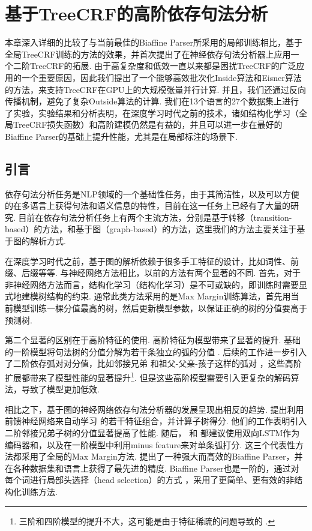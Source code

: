 \chapter{基于TreeCRF的高阶依存句法分析}\label{cha:dep-crf}

本章深入详细的比较了与当前最佳的Biaffine Parser所采用的局部训练相比，基于全局TreeCRF训练的方法的效果，并首次提出了在神经依存句法分析器上应用一个二阶TreeCRF的拓展.
由于高复杂度和低效一直以来都是困扰TreeCRF的广泛应用的一个重要原因，因此我们提出了一个能够高效批次化Inside算法和Eisner算法的方法，来支持TreeCRF在GPU上的大规模张量并行计算.
并且，我们还通过反向传播机制，避免了复杂Outside算法的计算.
我们在13个语言的27个数据集上进行了实验，实验结果和分析表明，在深度学习时代之前的技术，诸如结构化学习（全局TreeCRF损失函数）和高阶建模仍然是有益的，并且可以进一步在最好的Biaffine Parser的基础上提升性能，尤其是在局部标注的场景下.

\section{引言}
依存句法分析任务是NLP领域的一个基础性任务，由于其简洁性，以及可以方便的在多语言上获得句法和语义信息的特性，目前在这一任务上已经有了大量的研究.
目前在依存句法分析任务上有两个主流方法，分别是基于转移（transition-based）的方法，和基于图（graph-based）的方法，这里我们的方法主要关注于基于图的解析方式.

在深度学习时代之前，基于图的解析依赖于很多手工特征的设计，比如词性、前缀、后缀等等.
与神经网络方法相比，以前的方法有两个显著的不同.
首先，对于非神经网络方法而言，结构化学习（结构化学习）是不可或缺的，即训练时需要显式地建模树结构的约束.
通常此类方法采用的是Max Margin训练算法，首先用当前模型训练一棵分值最高的树，然后更新模型参数，以保证正确的树的分值要高于预测树.

第二个显著的区别在于高阶特征的使用. 高阶特征为模型带来了显著的提升.
基础的一阶模型将句法树的分值分解为若干条独立的弧的分值 \citep{mcdonald-etal-2005-online}. 后续的工作进一步引入了二阶依存弧对对分值，比如邻接兄弟 \citep{mcdonald-pereira-2006-online}和祖父-父亲-孩子这样的弧对 \citep{carreras-2007-experiments,koo-collins-2010-efficient}，这些高阶扩展都带来了模型性能的显著提升\footnote{三阶和四阶模型的提升不大，这可能是由于特征稀疏的问题导致的 \citep{koo-collins-2010-efficient,ma-zhao-2012-fourth}.}. 但是这些高阶模型需要引入更复杂的解码算法，导致了模型更加低效.

相比之下，基于图的神经网络依存句法分析器的发展呈现出相反的趋势.
\citep{pei-etal-2015-effective}提出利用前馈神经网络来自动学习 \citep{chen-manning-2014-fast}的若干特征组合，并计算子树得分.
他们的工作表明引入二阶邻接兄弟子树的分值显著提高了性能.
随后， \citep{wang-chang-2016-graph}和 \citep{kiperwasser-goldberg-2016-simple}都建议使用双向LSTM作为编码器和，以及在一阶模型中利用minus feature来对单条弧打分.
这三个代表性方法都采用了全局的Max Margin方法.
\citep{dozat-etal-2017-biaffine}提出了一种强大而高效的Biaffine Parser，并在各种数据集和语言上获得了最先进的精度.
Biaffine Parser也是一阶的，通过对每个词进行局部头选择（head selection）的方式 \citep{zhang-etal-2017-head}，采用了更简单、更有效的非结构化训练方法.

